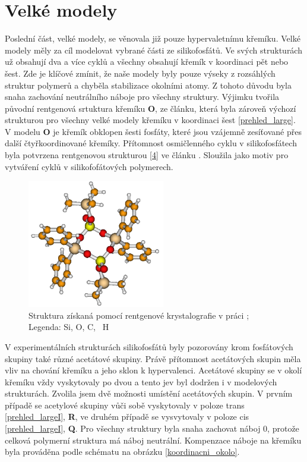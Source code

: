 \documentclass[
digital, %
table,   %
lof,     %
lot,     %
oneside,
]{fithesis3}
\begin{document}
\section{Velké modely}
Poslední část, velké modely, se věnovala již pouze hypervaletnímu křemíku. Velké modely měly za cíl modelovat vybrané části ze silikofosfátů. Ve svých strukturách už obsahují dva a více cyklů a všechny obsahují křemík v koordinaci pět nebo šest. Zde je klíčové zmínit, že naše modely byly pouze výseky z rozsáhlých struktur polymerů a chyběla stabilizace okolními atomy. Z tohoto důvodu byla snaha zachování neutrálního náboje pro všechny struktury. Výjimku tvořila původní rentgenová srtuktura křemíku \textbf{O}, ze článku\cite{C3NJ00721A},  která byla zároveň výchozí strukturou pro všechny velké modely křemíku v koordinaci šest \ref{prehled_large}.
V modelu \textbf{O} je křemík obklopen šesti fosfáty, které jsou vzájemně zesíťované přes další čtyřkoordinované křemíky. Přítomnost osmičlenného cyklu v silikofosfátech byla potvrzena rentgenovou strukturou \ref{4} ve článku \cite{rtg_4_pinkas}. Sloužila jako motiv pro vytváření cyklů v silikofofátových polymerech.
\begin{figure}
\begin{center}
\includegraphics[width=6cm]{rtg_4_kruh_samotne.png}
\caption{Struktura \ce{[(Ph2Si{O2P(O)OSiMe3})2]} získaná pomocí rentgenové krystalografie v práci \cite{rtg_4_pinkas};  Legenda:  Si,  O,  C, ~H}
\label{rtg_4}
\end{center}
\end{figure}
V experimentálních strukturách silikofosfátů byly pozorovány krom fosfátových skupiny také různé acetátové skupiny. Právě přítomnost acetátových skupin měla vliv na chování křemíku a jeho sklon k hypervalenci. Acetátové skupiny se  v okolí křemíku vždy vyskytovaly po dvou a tento jev byl dodržen i v modelových strukturách. Zvolila jsem dvě možnosti umístění acetátových skupin. V prvním případě se acetylové skupiny vůči sobě vyskytovaly v poloze trans \ref{prehled_largeI},  \textbf{R}, ve druhém případě se vysvytovaly v poloze cis \ref{prehled_largeI},  \textbf{Q}. Pro všechny struktury byla snaha zachovat náboj 0, protože celková polymerní struktura má náboj neutrální. Kompenzace náboje na křemíku byla prováděna podle schématu na obrázku \ref{koordinacni_okolo}. \\
\end{document}
